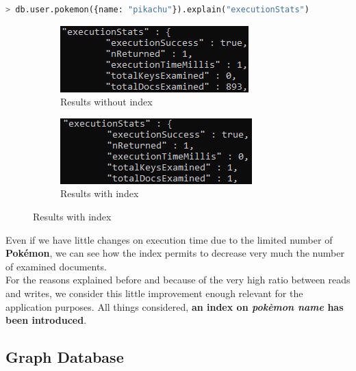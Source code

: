 \begin{lstlisting}[language=python]
	> db.user.pokemon({name: "pikachu"}).explain("executionStats")
\end{lstlisting}
\begin{figure}[H]
	\begin{subfigure}{0.48\textwidth}
		\includegraphics[width=0.9\linewidth]{img/PokemonNameNoIndex.png} 
		\caption{Results without index}
	\end{subfigure}
	\begin{subfigure}{0.48\textwidth}
		\includegraphics[width=0.9\linewidth]{img/PokemonNameIndex.png}
		\caption{Results with index}
	\end{subfigure}
\end{figure}


Even if we have little changes on execution time due to the limited number of \textbf{Pokémon}, we can see how the index permits to decrease very much the number of examined documents. \\
For the reasons explained before and because of the very high ratio between reads and writes, we consider this little improvement enough relevant for the application purposes. All things considered, \textbf{an index on \textit{pokèmon name} has been introduced}. 

\subsection{Graph Database}
